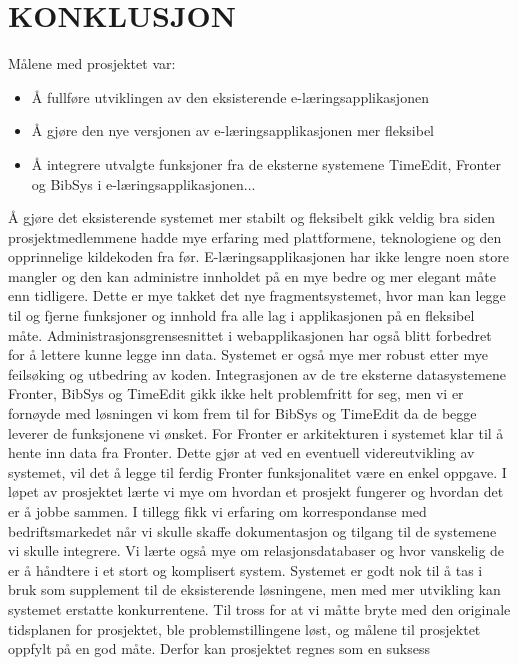 \documentclass[../main.tex]{subfiles}
\begin{document}
\chapter{KONKLUSJON}

Målene med prosjektet var:
\begin{itemize}
\item Å fullføre utviklingen av den eksisterende e-læringsapplikasjonen
\item Å gjøre den nye versjonen av e-læringsapplikasjonen mer fleksibel
\item Å integrere utvalgte funksjoner fra de eksterne systemene TimeEdit, Fronter og BibSys i e-læringsapplikasjonen...
\end{itemize}
Å gjøre det eksisterende systemet mer stabilt og fleksibelt gikk veldig bra siden prosjektmedlemmene hadde mye erfaring med plattformene, teknologiene og den opprinnelige kildekoden fra før. E-læringsapplikasjonen har ikke lengre noen store mangler og den kan administre innholdet på en mye bedre og mer elegant måte enn tidligere. Dette er mye takket det nye fragmentsystemet, hvor man kan legge til og fjerne funksjoner og innhold fra alle lag i applikasjonen på en fleksibel måte. Administrasjonsgrensesnittet i webapplikasjonen har også blitt forbedret for å lettere kunne legge inn data. Systemet er også mye mer robust etter mye feilsøking og utbedring av koden.\newline
\newline
Integrasjonen av de tre eksterne datasystemene Fronter, BibSys og TimeEdit gikk ikke helt problemfritt for seg, men vi er fornøyde med løsningen vi kom frem til for BibSys og TimeEdit da de begge leverer de funksjonene vi ønsket. For Fronter er arkitekturen i systemet klar til å hente inn data fra Fronter. Dette gjør at ved en eventuell videreutvikling av systemet, vil det å legge til ferdig Fronter funksjonalitet være en enkel oppgave.\newline
\newline
I løpet av prosjektet lærte vi mye om hvordan et prosjekt fungerer og hvordan det er å jobbe sammen. I tillegg fikk vi erfaring om korrespondanse med bedriftsmarkedet når vi skulle skaffe dokumentasjon og tilgang til de systemene vi skulle integrere. Vi lærte også mye om relasjonsdatabaser og hvor vanskelig de er å håndtere i et stort og komplisert system.\newline
\newline
Systemet er godt nok til å tas i bruk som supplement til de eksisterende løsningene, men med mer utvikling kan systemet erstatte konkurrentene.\newline
\newline
Til tross for at vi måtte bryte med den originale tidsplanen for prosjektet, ble problemstillingene løst, og målene til prosjektet oppfylt på en god måte. Derfor kan prosjektet regnes som en suksess

\newpage
\end{document}
